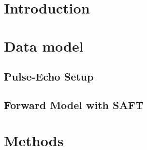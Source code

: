 \documentclass[10pt,twocolumn,a4paper,conference]{IEEEtran}
\begin{document}

\section{Introduction} \label{sec:intro}

%






\section{Data model}
\subsection{Pulse-Echo Setup} \label{sec:pulse_echo}


\subsection{Forward Model with SAFT} \label{sec:fwm_saft}




\section{Methods} \label{sec:methods} 

\end{document}
